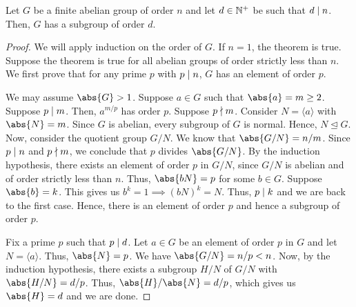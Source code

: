 \begin{theorem} \label{thm:abelian-subgroup-of-order-divisor}
    Let $G$ be a finite abelian group of order $n$ and let $d \in \mathbb{N}^+$ be such that $d \mid n$. Then, $G$ has a subgroup of order $d$.
\end{theorem}
\begin{proof}
    We will apply induction on the order of $G$. If $n = 1$, the theorem is true. Suppose the theorem is true for all abelian groups of order strictly less than $n$. We first prove that for any prime $p$ with $p \mid n$, $G$ has an element of order $p$.
    
    \medskip
    
    We may assume $\abs{G} > 1$. Suppose $a \in G$ such that $\abs{a} = m \geq 2$. Suppose $p \mid m$. Then, $a^{m/p}$ has order $p$. Suppose $p \nmid m$. Consider $N = \langle a \rangle$ with $\abs{N} = m$. Since $G$ is abelian, every subgroup of $G$ is normal. Hence, $N \trianglelefteq G$. Now, consider the quotient group $G/N$. We know that $\abs{G/N} = n/m$. Since $p \mid n$ and $p \nmid m$, we conclude that $p$ divides $\abs{G/N}$. By the induction hypothesis, there exists an element of order $p$ in $G/N$, since $G/N$ is abelian and of order strictly less than $n$. Thus, $\abs{bN} = p$ for some $b \in G$. Suppose $\abs{b} = k$. This gives us $b^k = 1 \implies (bN)^k = N$. Thus, $p \mid k$ and we are back to the first case. Hence, there is an element of order $p$ and hence a subgroup of order $p$.
    
    \medskip
    
    Fix a prime $p$ such that $p \mid d$. Let $a \in G$ be an element of order $p$ in $G$ and let $N = \langle a \rangle$. Thus, $\abs{N} = p$. We have $\abs{G/N} = n/p < n$. Now, by the induction hypothesis, there exists a subgroup $H/N$ of $G/N$ with $\abs{H/N} = d/p$. Thus, $\abs{H}/\abs{N} = d/p$, which gives us $\abs{H} = d$ and we are done.
\end{proof}